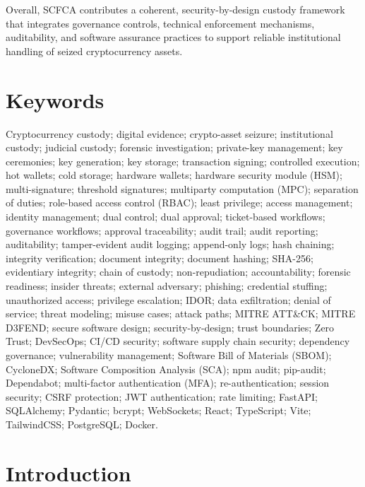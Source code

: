 \documentclass[12pt,a4paper]{report}
\begin{document}
Overall, SCFCA contributes a coherent, security-by-design custody framework that integrates governance controls, technical enforcement mechanisms, auditability, and software assurance practices to support reliable institutional handling of seized cryptocurrency assets.

\chapter*{Keywords}

Cryptocurrency custody; digital evidence; crypto-asset seizure; institutional custody; judicial custody; forensic investigation;
private-key management; key ceremonies; key generation; key storage; transaction signing; controlled execution;
hot wallets; cold storage; hardware wallets; hardware security module (HSM); multi-signature; threshold signatures; multiparty computation (MPC);
separation of duties; role-based access control (RBAC); least privilege; access management; identity management;
dual control; dual approval; ticket-based workflows; governance workflows; approval traceability;
audit trail; audit reporting; auditability; tamper-evident audit logging; append-only logs; hash chaining; integrity verification;
document integrity; document hashing; SHA-256; evidentiary integrity; chain of custody; non-repudiation; accountability; forensic readiness;
insider threats; external adversary; phishing; credential stuffing; unauthorized access; privilege escalation; IDOR; data exfiltration; denial of service;
threat modeling; misuse cases; attack paths; MITRE ATT\&CK; MITRE D3FEND;
secure software design; security-by-design; trust boundaries; Zero Trust;
DevSecOps; CI/CD security; software supply chain security; dependency governance; vulnerability management;
Software Bill of Materials (SBOM); CycloneDX; Software Composition Analysis (SCA); npm audit; pip-audit; Dependabot;
multi-factor authentication (MFA); re-authentication; session security; CSRF protection; JWT authentication; rate limiting;
FastAPI; SQLAlchemy; Pydantic; bcrypt; WebSockets; React; TypeScript; Vite; TailwindCSS; PostgreSQL; Docker.

\tableofcontents
\listoffigures
\listoftables
\clearpage

\chapter{Introduction}
\end{document}
